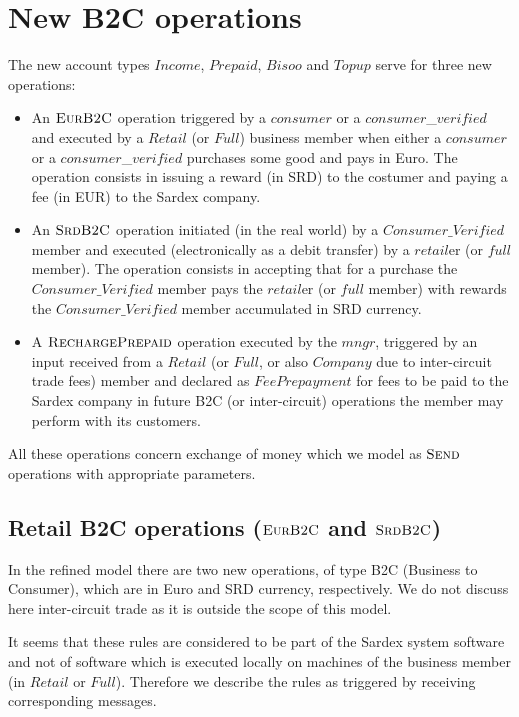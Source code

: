 \section{New B2C operations}
\label{sect:userops}

The new account types $Income$, $Prepaid$, $Bisoo$ and $Topup$ serve for three new operations:
\begin{itemize}
	\item An $\hbox{\sc EurB2C}$ operation triggered by a $consumer$ or a $consumer$\_$verified$ and executed by a $Retail$ (or $Full$) business member when either a $consumer$ or a $consumer$\_$verified$ purchases some good and pays in Euro. The operation consists in issuing a reward (in SRD) to the costumer and paying a fee (in EUR) to the Sardex company.
		
	\item An $\hbox{\sc SrdB2C}$ operation initiated (in the real world) by a $Consumer\_Verified$ member and executed (electronically as a debit transfer) by a $retail$er (or $full$ member). The operation consists in accepting that for a purchase the $Consumer\_Verified$ member pays the $retail$er (or $full$ member) with rewards the $Consumer\_Verified$ member accumulated in SRD currency. 
	
	\item  A $\hbox{\sc RechargePrepaid}$ operation executed by the $mngr$, triggered by an input received from a $Retail$ (or $Full$, or also $Company$ due to inter-circuit trade fees) member and declared as $FeePrepayment$ for fees to be paid to the Sardex company in future B2C (or inter-circuit) operations the member may perform with its customers.
	\end{itemize}
All these operations concern exchange of money which we model as $\hbox{\sc Send}$ operations with appropriate parameters.


\subsection{Retail B2C operations ($\hbox{\sc EurB2C}$ and $\hbox{\sc SrdB2C}$)}
\label{sect:eurob2c}

In the refined model there are two new operations, of type B2C (Business to Consumer), which are in Euro and SRD currency, respectively. We do not discuss here inter-circuit trade as it is outside the scope of this model.

It seems that these rules are considered to be part of the Sardex system software and not of software which is executed locally on machines of the business member (in $Retail$ or $Full$). Therefore we describe the rules as triggered by receiving corresponding messages.

